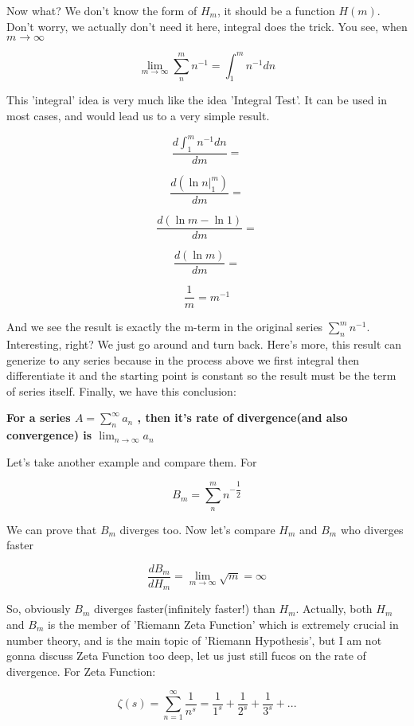 \documentclass{article}
\begin{document}
  Now what? We don't know the form of $H_m$, it should be a function $H(m)$. Don't worry, we actually don't need it here, integral does the trick. You see, when $m \to \infty$

  \[
	  \lim_{m \to \infty} \sum_{n}^{m} n^{-1} = \int_{1}^{m} n^{-1} dn
  \]

  This 'integral' idea is very much like the idea 'Integral Test'. It can be used in most cases, and would lead us to a very simple result.

  \[
	  \dfrac{d \displaystyle \int_{1}^{m} n^{-1} dn}{dm} = 
  \]

  \[
	  \dfrac{d \left( \ln n |_{1}^{m} \right)}{dm} = 
  \]

  \[
	  \dfrac{d (\ln m - \ln 1)}{dm} = 
  \]

  \[
	  \dfrac{d (\ln m)}{dm} = 
  \]

  \[
	  \dfrac{1}{m} = m^{-1}
  \]

  And we see the result is exactly the m-term in the original series $\displaystyle \sum_{n}^{m} n^{-1}$. Interesting, right? We just go around and turn back. Here's more, this result can generize to any series because in the process above we first integral then differentiate it and the starting point is constant so the result must be the term of series itself. Finally, we have this conclusion:

  \begin{center}
	  \textbf{For a series $A = \displaystyle \sum_{n}^{\infty} a_n$ , then it's rate of divergence(and also convergence) is $\displaystyle \lim_{n \to \infty} a_n$}
  \end{center}

  Let's take another example and compare them. For 

  \[
	  B_m = \displaystyle \sum_{n}^{m} n^{- \dfrac{1}{2}}  
  \]

  We can prove that $B_m$ diverges too. Now let's compare $H_m$ and $B_m$ who diverges faster

  \[
	  \dfrac{dB_m}{dH_m} = \displaystyle \lim_{m \to \infty} \sqrt{m} = \infty
  \]

  So, obviously $B_m$ diverges faster(infinitely faster!) than $H_m$. Actually, both $H_m$ and $B_m$ is the member of 'Riemann Zeta Function' which is extremely crucial in number theory, and is the main topic of 'Riemann Hypothesis', but I am not gonna discuss Zeta Function too deep, let us just still fucos on the rate of divergence. For Zeta Function:

  \[
	  \zeta(s) = \displaystyle \sum_{n=1}^{\infty} \dfrac{1}{n^s} = \dfrac{1}{1^s} + \dfrac{1}{2^s} + \dfrac{1}{3^s} + ...
  \]
\end{document}
